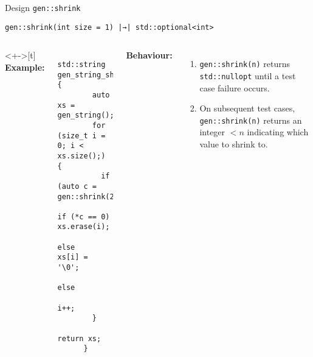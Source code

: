 \begin{frame}[fragile]{\halcheck{} \textemdash{} Design \textemdash{} \texttt{gen::shrink}}
  \begin{center}
    \texttt{gen::shrink(int size = 1) |→| std::optional<int>}
  \end{center}


  \begin{columns}<+->[t]
    \textbf{Example:}

    \begin{verbatim}
      std::string gen_string_shrink() {
        auto xs = gen_string();
        for (size_t i = 0; i < xs.size();) {
          if (auto c = gen::shrink(2))
            if (*c == 0) xs.erase(i);
            else         xs[i] = '\0';
          else
            i++;
        }
        return xs;
      }
    \end{verbatim}

    \textbf{Behaviour:}
    \begin{enumerate}
      \item<+-> \texttt{gen::shrink(n)} returns \texttt{std::nullopt} until a test case failure occurs.
      \item<+> On subsequent test cases, \texttt{gen::shrink(n)} returns an integer $< n$ indicating which value to shrink to.
    \end{enumerate}
  \end{columns}
\end{frame}

